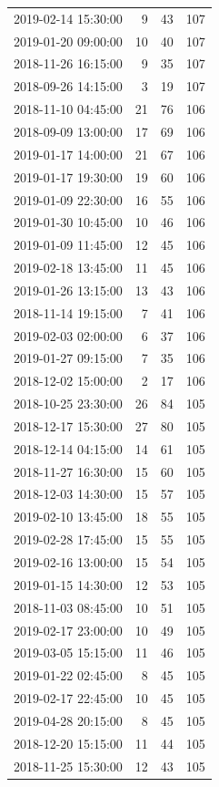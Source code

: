 \begin{tabular}{lrrr}
2019-02-14 15:30:00 & 9 & 43 & 107 \\
2019-01-20 09:00:00 & 10 & 40 & 107 \\
2018-11-26 16:15:00 & 9 & 35 & 107 \\
2018-09-26 14:15:00 & 3 & 19 & 107 \\
2018-11-10 04:45:00 & 21 & 76 & 106 \\
2018-09-09 13:00:00 & 17 & 69 & 106 \\
2019-01-17 14:00:00 & 21 & 67 & 106 \\
2019-01-17 19:30:00 & 19 & 60 & 106 \\
2019-01-09 22:30:00 & 16 & 55 & 106 \\
2019-01-30 10:45:00 & 10 & 46 & 106 \\
2019-01-09 11:45:00 & 12 & 45 & 106 \\
2019-02-18 13:45:00 & 11 & 45 & 106 \\
2019-01-26 13:15:00 & 13 & 43 & 106 \\
2018-11-14 19:15:00 & 7 & 41 & 106 \\
2019-02-03 02:00:00 & 6 & 37 & 106 \\
2019-01-27 09:15:00 & 7 & 35 & 106 \\
2018-12-02 15:00:00 & 2 & 17 & 106 \\
2018-10-25 23:30:00 & 26 & 84 & 105 \\
2018-12-17 15:30:00 & 27 & 80 & 105 \\
2018-12-14 04:15:00 & 14 & 61 & 105 \\
2018-11-27 16:30:00 & 15 & 60 & 105 \\
2018-12-03 14:30:00 & 15 & 57 & 105 \\
2019-02-10 13:45:00 & 18 & 55 & 105 \\
2019-02-28 17:45:00 & 15 & 55 & 105 \\
2019-02-16 13:00:00 & 15 & 54 & 105 \\
2019-01-15 14:30:00 & 12 & 53 & 105 \\
2018-11-03 08:45:00 & 10 & 51 & 105 \\
2019-02-17 23:00:00 & 10 & 49 & 105 \\
2019-03-05 15:15:00 & 11 & 46 & 105 \\
2019-01-22 02:45:00 & 8 & 45 & 105 \\
2019-02-17 22:45:00 & 10 & 45 & 105 \\
2019-04-28 20:15:00 & 8 & 45 & 105 \\
2018-12-20 15:15:00 & 11 & 44 & 105 \\
2018-11-25 15:30:00 & 12 & 43 & 105 \\

\end{tabular}
